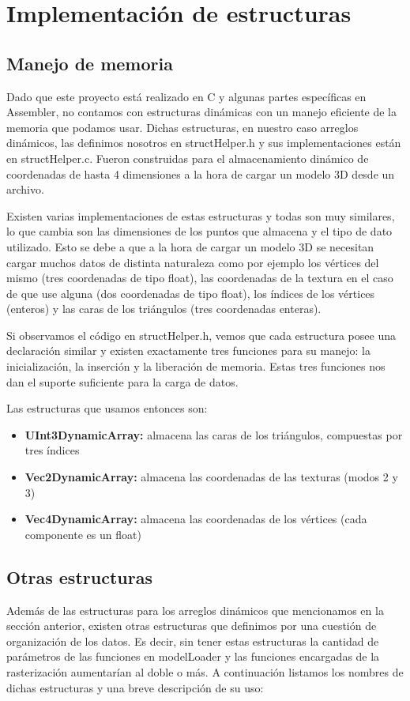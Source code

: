 \documentclass[a4paper]{article}
\begin{document}
\section{Implementación de estructuras}
\subsection{Manejo de memoria}
Dado que este proyecto está realizado en C y algunas partes específicas en Assembler, no contamos con estructuras dinámicas con un manejo eficiente de la memoria que podamos usar. Dichas estructuras, en nuestro caso arreglos dinámicos, las definimos nosotros en structHelper.h y sus implementaciones están en structHelper.c. Fueron construidas para el almacenamiento dinámico de coordenadas de hasta 4 dimensiones a la hora de cargar un modelo 3D desde un archivo.
\par Existen varias implementaciones de estas estructuras y todas son muy similares, lo que cambia son las dimensiones de los puntos que almacena y el tipo de dato utilizado. Esto se debe a que a la hora de cargar un modelo 3D se necesitan cargar muchos datos de distinta naturaleza como por ejemplo los vértices del mismo (tres coordenadas de tipo float), las coordenadas de la textura en el caso de que use alguna (dos coordenadas de tipo float), los índices de los vértices (enteros) y las caras de los triángulos (tres coordenadas enteras).
\par Si observamos el código en structHelper.h, vemos que cada estructura posee una declaración similar y existen exactamente tres funciones para su manejo: la inicialización, la inserción y la liberación de memoria. Estas tres funciones nos dan el suporte suficiente para la carga de datos.

Las estructuras que usamos entonces son:
\begin{itemize}
\item \textbf{UInt3DynamicArray: } almacena las caras de los triángulos, compuestas por tres índices
\item \textbf{Vec2DynamicArray: } almacena las coordenadas de las texturas (modos 2 y 3)
\item \textbf{Vec4DynamicArray: } almacena las coordenadas de los vértices (cada componente es un float)
\end{itemize}

\subsection{Otras estructuras}
Además de las estructuras para los arreglos dinámicos que mencionamos en la sección anterior, existen otras estructuras que definimos por una cuestión de organización de los datos. Es decir, sin tener estas estructuras la cantidad de parámetros de las funciones en modelLoader y las funciones encargadas de la rasterización aumentarían al doble o más. A continuación listamos los nombres de dichas estructuras y una breve descripción de su uso:
\end{document}
